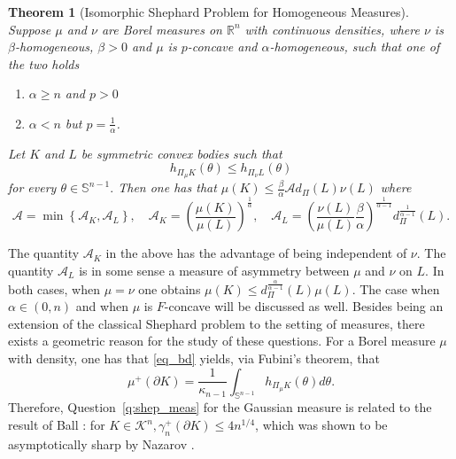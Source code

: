 \documentclass[11pt]{amsart}
\newtheorem{theorem}{Theorem}[section]
\theoremstyle{definition}
\theoremstyle{remark}
\numberwithin{equation}{section}
\newcommand{\R}{\mathbb{R}}
\newcommand{\s}{\mathbb{S}}
\newcommand{\conbod}{\mathcal{K}^n}
\begin{document}
\begin{theorem}[Isomorphic Shephard Problem for Homogeneous Measures]
\label{t:q_1} Suppose $\mu$ and $\nu$ are Borel measures on $\R^n$ with continuous densities, where $\nu$ is $\beta$-homogeneous, $\beta>0$ and $\mu$ is $p$-concave and $\alpha$-homogeneous, such that one of the two holds
\begin{enumerate}
    \item $\alpha \geq n$ and $p>0$
    \item $\alpha<n$ but $p=\frac{1}{\alpha}$.
\end{enumerate}
 Let $K$ and $L$ be symmetric convex bodies such that $$h_{\Pi_{\mu} K}(\theta) \le h_{\Pi_{\nu} L}(\theta)$$ for every $\theta\in\s^{n-1}.$ Then one has that
$\mu(K) \le \frac{\beta}{\alpha} \mathcal{A} d_{\Pi}(L) \nu(L)$
where
$$\mathcal{A}=\min\left\{\mathcal{A}_K,\mathcal{A}_L\right\}, \quad \mathcal{A}_K=\left(\frac{\mu(K)}{\mu(L)}\right)^{\frac{1}{\alpha}}, \quad \mathcal{A}_L=\left(\frac{\nu(L)}{\mu(L)}\frac{\beta }{\alpha}\right)^{\frac{1}{\alpha-1}}d^\frac{1}{\alpha-1}_{\Pi}(L).$$
\end{theorem}
The quantity $\mathcal{A}_K$ in the above has the advantage of being independent of $\nu$. The quantity $\mathcal{A}_L$ is in some sense a measure of asymmetry between $\mu$ and $\nu$ on $L$. In both cases, when $\mu=\nu$ one obtains
$\mu(K)\leq d^{\frac{\alpha}{\alpha -1}}_{\Pi}(L)\mu(L)$.
The case when $\alpha\in(0,n)$ and when $\mu$ is $F$-concave will be discussed as well. Besides being an extension of the classical Shephard problem to the setting of measures, there exists a geometric reason for the study of these questions. For a Borel measure $\mu$ with density, one has that \eqref{eq_bd} yields, via Fubini's theorem, that 
\begin{equation}
\label{eq:sur}
\mu^+(\partial K)=\frac{1}{\kappa_{n-1}}\int_{\s^{n-1}}h_{\Pi_{\mu} K}(\theta)d\theta.
\end{equation}
Therefore, Question~\ref{q:shep_meas} for the Gaussian measure is related to the result of Ball \cite{Ball93}:
for $K\in\conbod, \gamma^+_n(\partial K)\leq 4n^{1/4}$, which was shown to be asymptotically sharp by Nazarov \cite{Naz03}.
\end{document}
